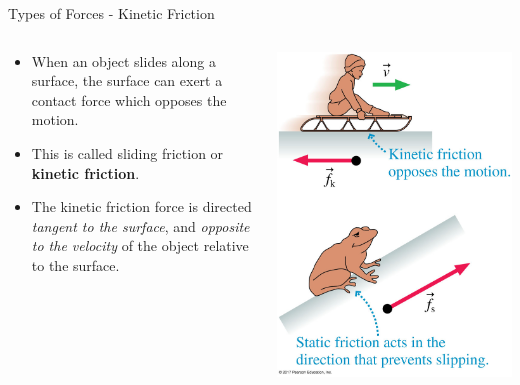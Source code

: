 \documentclass{beamer}
\begin{document}
\begin{frame}{Types of Forces - Kinetic Friction}
\begin{columns}
\begin{column}{0.6\textwidth}
\begin{itemize}
   \item When an object slides along a surface, the surface can exert a contact force which opposes the motion.
   \item This is called sliding friction or {\bf kinetic friction}.
   \item The kinetic friction force is directed {\it tangent to the surface}, and {\it opposite to the velocity} of the object relative to the surface.
\end{itemize}
\end{column}
\begin{column}{0.4\textwidth}
\begin{center}
   \includegraphics[width=\textwidth,trim={0 9cm 0 0},clip]{../figures/05_08_Figure.jpg}
\end{center}
\end{column}
\end{columns}
\end{frame}
\end{document}
